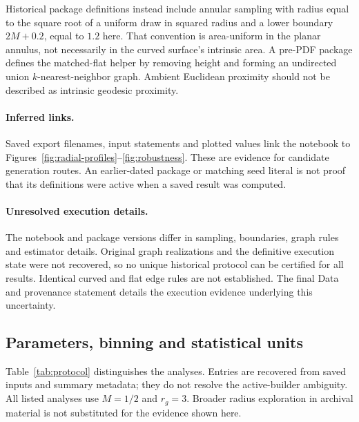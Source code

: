 \documentclass[11pt,a4paper]{article}
\begin{document}
Historical package definitions instead include annular sampling with radius equal to the square root of a uniform draw in squared radius and a lower boundary $2M+0.2$, equal to $1.2$ here. That convention is area-uniform in the planar annulus, not necessarily in the curved surface's intrinsic area. A pre-PDF package defines the matched-flat helper by removing height and forming an undirected union $k$-nearest-neighbor graph. Ambient Euclidean proximity should not be described as intrinsic geodesic proximity.

\paragraph{Inferred links.}
Saved export filenames, input statements and plotted values link the notebook to Figures~\ref{fig:radial-profiles}--\ref{fig:robustness}. These are evidence for candidate generation routes. An earlier-dated package or matching seed literal is not proof that its definitions were active when a saved result was computed.

\paragraph{Unresolved execution details.}
The notebook and package versions differ in sampling, boundaries, graph rules and estimator details. Original graph realizations and the definitive execution state were not recovered, so no unique historical protocol can be certified for all results. Identical curved and flat edge rules are not established. The final Data and provenance statement details the execution evidence underlying this uncertainty.

\subsection{Parameters, binning and statistical units}
Table~\ref{tab:protocol} distinguishes the analyses. Entries are recovered from saved inputs and summary metadata; they do not resolve the active-builder ambiguity. All listed analyses use $M=1/2$ and $r_g=3$. Broader radius exploration in archival material is not substituted for the evidence shown here.
\end{document}

